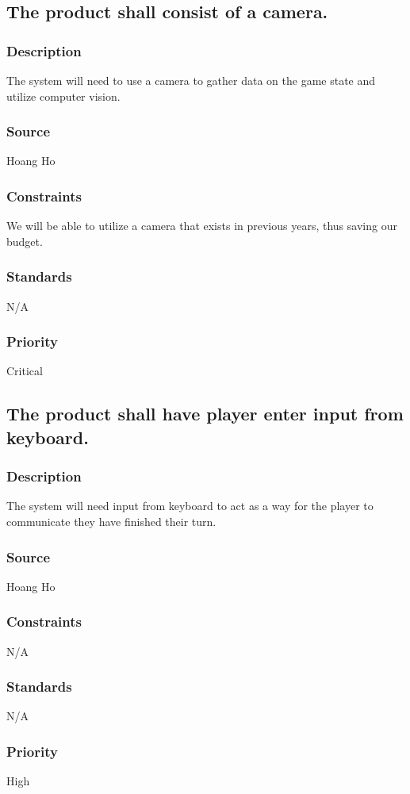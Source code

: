 \subsection{The product shall consist of a camera.}
\subsubsection{Description}
The system will need to use a camera to gather data on the game state and utilize computer vision.
\subsubsection{Source}
Hoang Ho
\subsubsection{Constraints}
We will be able to utilize a camera that exists in previous years, thus saving our budget.
\subsubsection{Standards}
N/A
\subsubsection{Priority}
Critical

\subsection{The product shall have player enter input from keyboard.}
\subsubsection{Description}
The system will need input from keyboard to act as a way for the player to communicate they have finished their turn.
\subsubsection{Source}
Hoang Ho
\subsubsection{Constraints}
N/A
\subsubsection{Standards}
N/A
\subsubsection{Priority}
High

